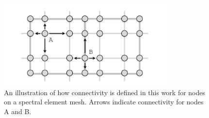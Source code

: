 \documentclass[gmdd, hvmath]{copernicus}
\begin{document}
\begin{figure}
\begin{center}
\includegraphics[width=3.5in]{FiniteElementFeatureTracking.pdf}
\end{center}
\caption{An illustration of how connectivity is defined in this work for nodes on a spectral element mesh.  Arrows indicate connectivity for nodes A and B.} \label{fig:FiniteElementConnectivity}
\end{figure}
\end{document}
